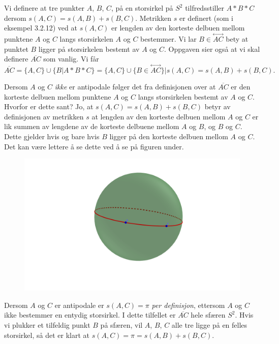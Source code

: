\begin{oppgave}[3.2.6]
  Vi definere at tre punkter $A$, $B$, $C$, på en storsirkel på $S^2$ tilfredsstiller
  $A\ast B\ast C$ dersom $s(A, C) = s(A, B) + s(B, C)$. Metrikken $s$ er definert (som
  i eksempel 3.2.12) ved at $s(A, C)$ er lengden av den korteste delbuen mellom punktene 
  $A$ og $C$ langs storsirkelen $A$ og $C$ bestemmer. Vi lar 
  $B\in \overset{\longleftrightarrow}{AC}$ bety at punktet $B$ ligger på storsirkelen 
  bestemt av $A$ og $C$. Oppgaven sier også at vi skal definere $\overline{AC}$ som 
  vanlig. Vi får $$\overline{AC} = \{A, C\}\cup \{B\vert A\ast B\ast C \} 
       = \{A, C\}\cup \{B\in \overset{\longleftrightarrow}{AC}\}\vert s(A,C) 
       = s(A, B) + s(B, C).$$

  \begin{punkt}
    Dersom $A$ og $C$ \emph{ikke} er antipodale følger det fra definisjonen over at 
    $\overline{AC}$ er den korteste delbuen mellom punktene $A$ og $C$ langs storsirkelen 
    bestemt av $A$ og $C$. Hvorfor er dette sant? Jo, at $s(A, C) = s(A, B) + s(B, C)$ 
    betyr av definisjonen av metrikken $s$ at lengden av den korteste delbuen mellom $A$ 
    og $C$ er lik summen av lengdene av de korteste delbuene mellom $A$ og $B$, og $B$ 
    og $C$. Dette gjelder hvis og bare hvis $B$ ligger på den korteste delbuen mellom $A$ 
    og $C$. Det kan være lettere å se dette ved å se på figuren under. 
    \begin{figure}[H]
      \centering
      \includegraphics[trim={12cm 12cm 12cm 6cm},clip, width=\textwidth]{oving_1/326.png}
    \end{figure}
  \end{punkt}

  \begin{punkt}
    Dersom $A$ og $C$ er antipodale er $s(A, C)=\pi$ \emph{per definisjon}, ettersom $A$ 
    og $C$ ikke bestemmer en entydig storsirkel. I dette tilfellet er $\overline{AC}$ 
    hele sfæren $S^2$. Hvis vi plukker et tilfeldig punkt $B$ på sfæren, vil $A$, $B$, 
    $C$ alle tre ligge på en felles storsirkel, så det er klart at 
    $s(A,C) = \pi = s(A, B)+s(B, C)$. 
  \end{punkt}
\end{oppgave}



